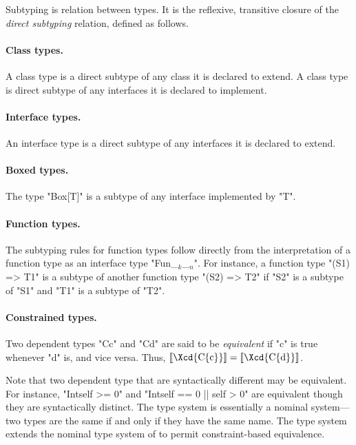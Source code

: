 Subtyping is relation between types.  It is the
reflexive, transitive 
closure of the {\em direct subtyping} relation, defined as
follows.

\paragraph{Class types.}  A class type is a direct subtype of
any
class it is declared to extend.  A class type is direct subtype
of any interfaces it is declared to implement.

\paragraph{Interface types.}  An interface type is a direct
subtype of any interfaces it is declared to extend.

\paragraph{Boxed types.}
The type \xcd"Box[T]" is a subtype of any interface implemented
by \xcd"T".

\paragraph{Function types.}

The subtyping rules for function types follow directly from the
interpretation of a function type as an interface type
\xcdmath"Fun_$_k$_$_n$".
For instance,
a function type
\xcd"(S1) => T1" 
is a subtype of another function type
\xcd"(S2) => T2" 
if \xcd"S2" is a subtype of \xcd"S1"
and \xcd"T1" is a subtype of \xcd"T2".

\paragraph{Constrained types.}

Two dependent types \xcd"C{c}" and \xcd"C{d}" are said to be {\em equivalent} if 
\xcd"c" is true whenever \xcd"d" is, and vice versa. Thus, 
$\LL{\mbox{\Xcd{C\{c\}}}} = \LL{\mbox{\Xcd{C\{d\}}}}$.

Note that two dependent type that are syntactically different may be
equivalent. For instance, \xcd"Int{self >= 0}" and
\xcd"Int{self == 0 || self > 0}" are equivalent though they are syntactically
distinct. The \Java{} type system is essentially a nominal system---two
types are the same if and only if they have the same name. The \Xten{}
type system extends the nominal type system of \Java{} to permit
constraint-based equivalence.

